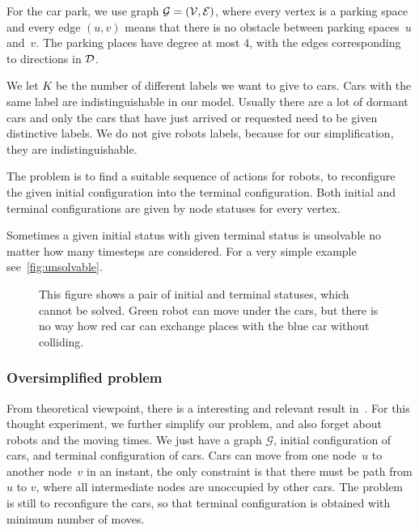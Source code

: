 For the car park, we use graph $\mathcal{G} = (\mathcal{V},\mathcal{E})$, where every vertex is a
parking space and every edge $(u,v)$ means that there is no obstacle between
parking spaces~$u$ and~$v$. The parking places have degree at most 4,
with the edges corresponding to directions in $\mathcal{D}$.

We let $K$ be the number of different labels we want to give to cars. Cars with
the same label are indistinguishable in our model. Usually there are a lot of
dormant cars and only the cars that have just arrived or requested need to be
given distinctive labels. We do not give robots labels, because for our
simplification, they are indistinguishable.

The problem is to find a suitable sequence of actions for robots, to
reconfigure the given initial configuration into the terminal configuration.
Both initial and terminal configurations are given by node statuses for every
vertex.

Sometimes a given initial status with given terminal status is unsolvable no
matter how many timesteps are considered. For a very simple example
see~\autoref{fig:unsolvable}.

\begin{figure}[h]
    \begin{center}
        
        \caption{This figure shows a pair of initial and terminal statuses,
            which cannot be solved. Green robot can move under the cars, but there
            is no way how red car can exchange places with the blue car without
        colliding.}
        \label{fig:unsolvable}
    \end{center}
\end{figure}

\subsubsection{Oversimplified problem}
From theoretical viewpoint, there is a interesting and relevant result
in~\cite{calinescu2008reconfigurations}. For this thought experiment, we further
simplify our problem, and also forget about robots and the moving times. We
just have a graph $\mathcal{G}$, initial configuration of cars, and terminal
configuration of cars. Cars can move from one node~$u$ to another node~$v$ in
an instant, the only constraint is that there must be path from $u$ to $v$,
where all intermediate nodes are unoccupied by other cars. The problem is still
to reconfigure the cars, so that terminal configuration is obtained with
minimum number of moves. 

